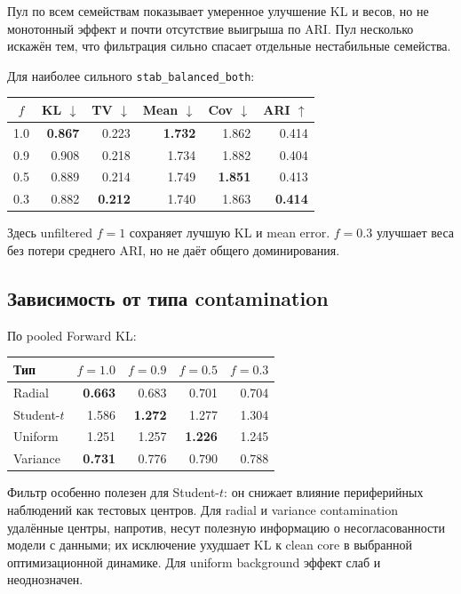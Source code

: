 \documentclass[11pt,a4paper]{article}
\newcommand{\code}[1]{{\footnotesize\nolinkurl{#1}}}
\newcommand{\best}[1]{\textbf{\color{green}#1}}
\begin{document}
Пул по всем семействам показывает умеренное улучшение KL и весов, но не
монотонный эффект и почти отсутствие выигрыша по ARI. Пул несколько
искажён тем, что фильтрация сильно спасает отдельные нестабильные семейства.

Для наиболее сильного \code{stab_balanced_both}:

\begin{center}
\small
\begin{tabular}{@{}crrrrr@{}}
\toprule
\rowcolor{lightgray}
$f$ & \textbf{KL} $\downarrow$ & \textbf{TV} $\downarrow$ &
\textbf{Mean} $\downarrow$ & \textbf{Cov} $\downarrow$ & \textbf{ARI} $\uparrow$\\
\midrule
1.0 & \best{0.867} & 0.223 & \best{1.732} & 1.862 & 0.414\\
0.9 & 0.908 & 0.218 & 1.734 & 1.882 & 0.404\\
0.5 & 0.889 & 0.214 & 1.749 & \best{1.851} & 0.413\\
0.3 & 0.882 & \best{0.212} & 1.740 & 1.863 & \best{0.414}\\
\bottomrule
\end{tabular}
\end{center}

Здесь unfiltered $f=1$ сохраняет лучшую KL и mean error. $f=0.3$ улучшает
веса без потери среднего ARI, но не даёт общего доминирования.

\subsection{Зависимость от типа contamination}

По pooled Forward KL:

\begin{center}
\small
\begin{tabular}{@{}lrrrr@{}}
\toprule
\rowcolor{lightgray}
\textbf{Тип} & $f=1.0$ & $f=0.9$ & $f=0.5$ & $f=0.3$\\
\midrule
Radial      & \best{0.663} & 0.683 & 0.701 & 0.704\\
Student-$t$ & 1.586 & \best{1.272} & 1.277 & 1.304\\
Uniform     & 1.251 & 1.257 & \best{1.226} & 1.245\\
Variance    & \best{0.731} & 0.776 & 0.790 & 0.788\\
\bottomrule
\end{tabular}
\end{center}

Фильтр особенно полезен для Student-$t$: он снижает влияние периферийных
наблюдений как тестовых центров. Для radial и variance contamination
удалённые центры, напротив, несут полезную информацию о несогласованности
модели с данными; их исключение ухудшает KL к clean core в выбранной
оптимизационной динамике. Для uniform background эффект слаб и неоднозначен.
\end{document}
